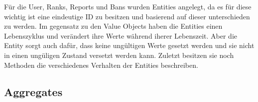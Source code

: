 



Für die User, Ranks, Reports und Bans wurden Entities angelegt,
da es für diese wichtig ist eine eindeutige ID zu besitzen und basierend auf dieser unterschieden zu werden.
Im gegensatz zu den Value Objects haben die Entities einen Lebenszyklus und verändert ihre Werte während iherer Lebenszeit.
Aber die Entity sorgt auch dafür, dass keine ungültigen Werte gesetzt werden und sie nicht in einen ungüligen Zustand versetzt werden kann.
Zuletzt besitzen sie noch Methoden die verschiedenes Verhalten der Entities beschreiben.


\subsection{Aggregates}


